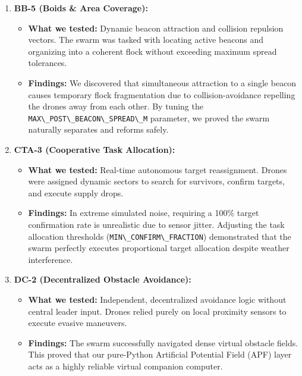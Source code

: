 \documentclass[11pt,a4paper]{article}
\newcommand{\code}[1]{\lstinline[basicstyle=\ttfamily\small,columns=fullflexible]|#1|}
\begin{document}
\begin{enumerate}[leftmargin=1.8em]
    \item \textbf{BB-5 (Boids \& Area Coverage):} 
    \begin{itemize}[leftmargin=1.5em]
        \item \textbf{What we tested:} Dynamic beacon attraction and collision repulsion vectors. The swarm was tasked with locating active beacons and organizing into a coherent flock without exceeding maximum spread tolerances.
        \item \textbf{Findings:} We discovered that simultaneous attraction to a single beacon causes temporary flock fragmentation due to collision-avoidance repelling the drones away from each other. By tuning the \code{MAX\_POST\_BEACON\_SPREAD\_M} parameter, we proved the swarm naturally separates and reforms safely.
    \end{itemize}

    \item \textbf{CTA-3 (Cooperative Task Allocation):}
    \begin{itemize}[leftmargin=1.5em]
        \item \textbf{What we tested:} Real-time autonomous target reassignment. Drones were assigned dynamic sectors to search for survivors, confirm targets, and execute supply drops.
        \item \textbf{Findings:} In extreme simulated noise, requiring a 100\% target confirmation rate is unrealistic due to sensor jitter. Adjusting the task allocation thresholds (\code{MIN\_CONFIRM\_FRACTION}) demonstrated that the swarm perfectly executes proportional target allocation despite weather interference.
    \end{itemize}

    \item \textbf{DC-2 (Decentralized Obstacle Avoidance):}
    \begin{itemize}[leftmargin=1.5em]
        \item \textbf{What we tested:} Independent, decentralized avoidance logic without central leader input. Drones relied purely on local proximity sensors to execute evasive maneuvers.
        \item \textbf{Findings:} The swarm successfully navigated dense virtual obstacle fields. This proved that our pure-Python Artificial Potential Field (APF) layer acts as a highly reliable virtual companion computer.
    \end{itemize}


\end{enumerate}
\end{document}
